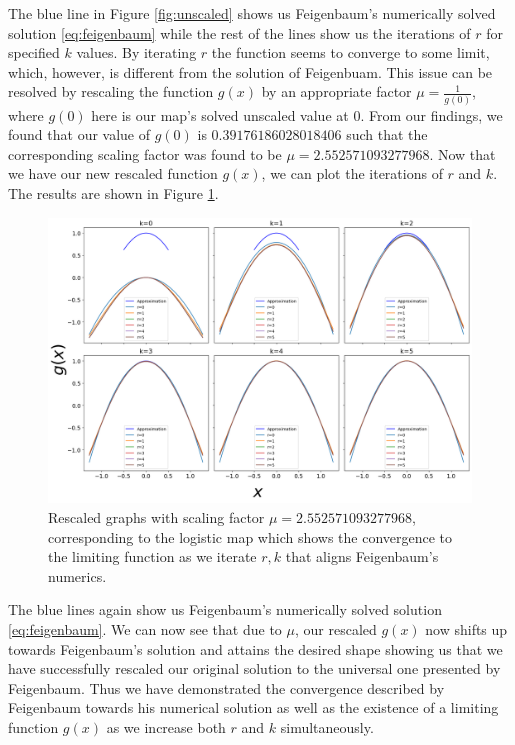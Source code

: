 \begin{exmp}
    The blue line in Figure \ref{fig:unscaled} shows us Feigenbaum's numerically solved solution \eqref{eq:feigenbaum} while the rest of the lines show us the iterations of $r$ for specified $k$ values. 
	By iterating $r$ the function seems to converge to some limit, which, however, is different from the solution of Feigenbuam.
	This issue can be resolved by rescaling the function $g(x)$ by an appropriate factor $\mu = \frac{1}{g(0)}$, where $g(0)$ here is our map's solved unscaled value at 0. 
    From our findings, we found that our value of $g(0)$ is $0.39176186028018406$ such that the corresponding scaling factor was found to be $\mu= 2.552571093277968$. Now that we have our new rescaled function $g(x)$, we can plot the iterations of $r$ and $k$. 
	The results are shown in Figure \ref{fig:rescaled}.
    \begin{figure}
    \centering
    \includegraphics[width=1\textwidth]{Feigenbaum Approx Graphs/feigenbaum_scaled.png}
    \caption{Rescaled graphs with scaling factor $\mu=2.552571093277968$, corresponding to the logistic map which shows the convergence to the limiting function as we iterate $r,k$ that aligns Feigenbaum's numerics.}
    \label{fig:rescaled}
\end{figure}
The blue lines again show us Feigenbaum's numerically solved solution \eqref{eq:feigenbaum}. 
We can now see that due to $\mu$, our rescaled $g(x)$ now shifts up towards Feigenbaum's solution and attains the desired shape showing us that we have successfully rescaled our original solution to the universal one presented by Feigenbaum. 
Thus we have demonstrated the convergence described by Feigenbaum towards his numerical solution as well as the existence of a limiting function $g(x)$ as we increase both $r$ and $k$ simultaneously. 
\end{exmp}

